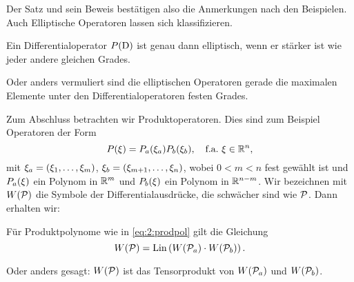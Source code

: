 Der Satz und sein Beweis bestätigen also die Anmerkungen nach den Beispielen.
Auch Elliptische Operatoren lassen sich klassifizieren.

\begin{thm}
Ein Differentialoperator $P(\mathrm D)$ ist genau dann elliptisch,
wenn er stärker ist wie jeder andere gleichen Grades.
\end{thm}

Oder anders vermuliert sind die elliptischen Operatoren
gerade die maximalen Elemente
unter den Differentialoperatoren festen Grades.

Zum Abschluss betrachten wir Produktoperatoren.
Dies sind zum Beispiel Operatoren der Form
\begin{equation}\label{eq:2:prodpol}
P(\xi)=P_a(\xi_a)P_b(\xi_b),
\quad\text{f.a.}~\xi\in\mathbb R^n,
\end{equation}
mit $\xi_a=(\xi_1,\dots,\xi_m)$, $\xi_b=(\xi_{m+1},\dots,\xi_n)$,
wobei $0<m<n$ fest gewählt ist
und $P_a(\xi)$ ein Polynom in $\mathbb R^m$
und $P_b(\xi)$ ein Polynom in $\mathbb R^{n-m}$.
Wir bezeichnen mit $W(\mathcal P)$ die Symbole der Differentialausdrücke,
die schwächer sind wie $\mathcal P$.
Dann erhalten wir:

\begin{thm}
Für Produktpolynome wie in \eqref{eq:2:prodpol}
gilt die Gleichung
\begin{equation}
W(\mathcal P)=\operatorname{Lin}\left(W(\mathcal P_a)\cdot W(\mathcal P_b)\right).
\end{equation}
\end{thm}

Oder anders gesagt:
$W(\mathcal P)$ ist das Tensorprodukt von $W(\mathcal P_a)$ und $W(\mathcal P_b)$.

